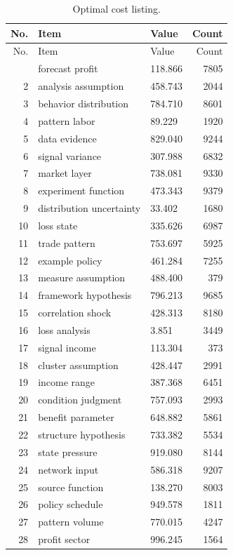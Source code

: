 \documentclass[11pt]{report}
\begin{document}
\begin{longtable}{rllr}\caption{Optimal cost listing.}\label{tab:l12}\\\toprule No. & Item & Value & Count \\ \midrule \endfirsthead\toprule No. & Item & Value & Count \\ \midrule \endhead\bottomrule \endfoot
1 & forecast profit & 118.866 & 7805 \\
2 & analysis assumption & 458.743 & 2044 \\
3 & behavior distribution & 784.710 & 8601 \\
4 & pattern labor & 89.229 & 1920 \\
5 & data evidence & 829.040 & 9244 \\
6 & signal variance & 307.988 & 6832 \\
7 & market layer & 738.081 & 9330 \\
8 & experiment function & 473.343 & 9379 \\
9 & distribution uncertainty & 33.402 & 1680 \\
10 & loss state & 335.626 & 6987 \\
11 & trade pattern & 753.697 & 5925 \\
12 & example policy & 461.284 & 7255 \\
13 & measure assumption & 488.400 & 379 \\
14 & framework hypothesis & 796.213 & 9685 \\
15 & correlation shock & 428.313 & 8180 \\
16 & loss analysis & 3.851 & 3449 \\
17 & signal income & 113.304 & 373 \\
18 & cluster assumption & 428.447 & 2991 \\
19 & income range & 387.368 & 6451 \\
20 & condition judgment & 757.093 & 2993 \\
21 & benefit parameter & 648.882 & 5861 \\
22 & structure hypothesis & 733.382 & 5534 \\
23 & state pressure & 919.080 & 8144 \\
24 & network input & 586.318 & 9207 \\
25 & source function & 138.270 & 8003 \\
26 & policy schedule & 949.578 & 1811 \\
27 & pattern volume & 770.015 & 4247 \\
28 & profit sector & 996.245 & 1564 \\

\end{longtable}
\end{document}
